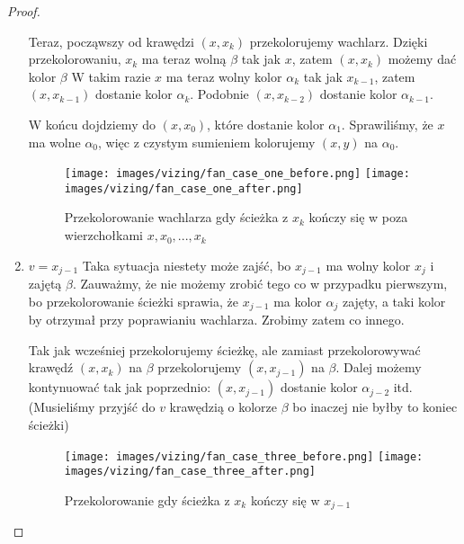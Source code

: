 \begin{proof}
\begin{enumerate}
		      Teraz, począwszy od krawędzi \((x, x_k)\) przekolorujemy wachlarz.
		      Dzięki przekolorowaniu, \(x_k\) ma teraz wolną \(\beta\) tak jak \(x\), zatem \((x, x_k)\) możemy dać kolor \(\beta\)
		      W takim razie \(x\) ma teraz wolny kolor \(\alpha_k\) tak jak \(x_{k - 1}\),
		      zatem \((x, x_{k-1})\) dostanie kolor \(\alpha_k\).
		      Podobnie \((x, x_{k-2})\) dostanie kolor \(\alpha_{k-1}\).

		      W końcu dojdziemy do \((x, x_0)\), które dostanie kolor \(\alpha_1\). Sprawiliśmy, że \(x\) ma wolne \(\alpha_0\),
		      więc z czystym sumieniem kolorujemy \((x, y)\) na \(\alpha_0\).

		      \begin{figure}[H]
			      \centering
			      \texttt{[image: images/vizing/fan\_case\_one\_before.png]}
			      \texttt{[image: images/vizing/fan\_case\_one\_after.png]}
			      \caption{Przekolorowanie wachlarza gdy ścieżka z \(x_k\) kończy się w poza wierzchołkami \(x, x_0, ..., x_k\)}
		      \end{figure}

		\item \(v = x_{j - 1}\)
		      Taka sytuacja niestety może zajść, bo \(x_{j-1}\) ma wolny kolor \(x_j\) i zajętą \(\beta\).
		      Zauważmy, że nie możemy zrobić tego co w przypadku pierwszym, bo przekolorowanie ścieżki sprawia, że \(x_{j-1}\) ma kolor \(\alpha_j\) zajęty, a taki kolor by otrzymał przy poprawianiu wachlarza. Zrobimy zatem co innego.

		      Tak jak wcześniej przekolorujemy ścieżkę,
		      ale zamiast przekolorowywać krawędź \((x, x_k)\) na \(\beta\)
		      przekolorujemy \((x, x_{j-1})\) na \(\beta\).
		      Dalej możemy kontynuować tak jak poprzednio: \((x, x_{j-1})\) dostanie kolor \(\alpha_{j-2}\) itd. (Musieliśmy przyjść do \(v\) krawędzią o kolorze \(\beta\) bo inaczej nie byłby to koniec ścieżki)


		      \begin{figure}[H]
			      \centering
			      \texttt{[image: images/vizing/fan\_case\_three\_before.png]}
			      \texttt{[image: images/vizing/fan\_case\_three\_after.png]}
			      \caption{Przekolorowanie gdy ścieżka z \(x_k\) kończy się w \(x_{j-1}\)}
		      \end{figure}

	\end{enumerate}



\end{proof}
